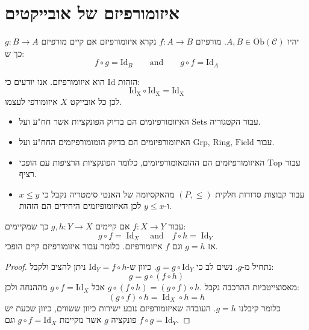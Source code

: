 \documentclass{tstextbook}
\begin{document}
\section{איזומורפיזם של אובייקטים}

\begin{definition}
יהיו \(A,B \in \mathrm{Ob}(\mathcal{C})\). מורפיזם \(f:A\to B\) נקרא איזומורפיזם אם קיים מורפיזם \(g:B\to A\) כך ש:
$$f\circ  g = \mathrm{Id}_{B}\qquad \text{and}\qquad g \circ  f = \mathrm{Id}_{A}$$

\end{definition}
\begin{example}
הזהות \(\mathrm{Id}\) הוא איזומורפיזם. אנו יודעים כי:
$$\mathrm{Id_{X}\circ Id_{X}=Id_{X}}$$
לכן כל אובייקט \(X\) איזומורפי לעצמו.

\end{example}
\begin{example}
  \begin{itemize}
    \item עבור הקטגוריה \(\text{Sets}\) האיזומורפיזמים הם בדיוק הפונקציות אשר חח"ע ועל. 
    \item עבור \(\text{Grp, Ring, Field}\) האיזומורפיזמים הם בדיוק הומומורפיזמים החח"ע ועל.
    \item עבור \(\text{Top}\) האיזומורפיזמים הם ההומאומורפיזמים, כלומר הפונקציות הרציפות עם הופכי רציף.
    \item עבור קבוצות סדורות חלקית \(\left( P,\leq \right)\) מהאקסיומה של האנטי סימטריה נקבל כי \(x\leq y\) ו-\(y\leq x\) לכן האיזומופיזמים היחידים הם הזהות.
  \end{itemize}
\end{example}
\begin{proposition}
עבור \(f:X\to Y\) אם קיימים \(g,h:Y\to X\) כך שמקיימים:
$$g\circ f=\operatorname{Id}_{X}\quad{\mathrm{and}}\quad f\circ h=\operatorname{Id}_{Y}$$
אז \(g=h\) וגם \(f\) איזומורפיזם. כלומר עבור איזומורפיזם קיים הופכי.

\end{proposition}
\begin{proof}
נתחיל מ-\(g\). נשים לב כי \(g=g\circ\mathrm{Id}_{Y}\). כיוון ש-\(\mathrm{Id}_{Y}=f\circ h\) ניתן להציב ולקבל:
$$g=g\circ(f\circ h)$$
מאסוצייטביות ההרכבה נקבל \(g\circ(f\circ h)=(g\circ f)\circ h.\) אבל \(g \circ f = \mathrm{Id}_{X}\) מההנחה ולכן:
$$(g\circ f)\circ h=\operatorname{Id}_{X}\circ h=h$$
כלומר קיבלנו \(g=h\). העובדה שאיזומורפיזם נובע ישירות כיוון ששווים, כיוון שכעת יש פונקציה \(g\) אשר מקיימת \(g\circ f = \mathrm{Id}_{X}\) וגם \(f\circ g = \mathrm{Id}_{Y}\).

\end{proof}
\end{document}
